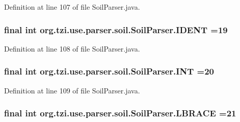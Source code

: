 Definition at line 107 of file Soil\-Parser.\-java.

\hypertarget{classorg_1_1tzi_1_1use_1_1parser_1_1soil_1_1_soil_parser_a79c40d3fad0b74d09c9e985a6bef0285}{
\subsubsection[{I\-D\-E\-N\-T}]{\setlength{\rightskip}{0pt plus 5cm}final int org.\-tzi.\-use.\-parser.\-soil.\-Soil\-Parser.\-I\-D\-E\-N\-T =19\hspace{0.3cm}{\ttfamily [static]}}}\label{classorg_1_1tzi_1_1use_1_1parser_1_1soil_1_1_soil_parser_a79c40d3fad0b74d09c9e985a6bef0285}


Definition at line 108 of file Soil\-Parser.\-java.

\hypertarget{classorg_1_1tzi_1_1use_1_1parser_1_1soil_1_1_soil_parser_a5220867ecf62025a93b2fddf9031a053}{
\subsubsection[{I\-N\-T}]{\setlength{\rightskip}{0pt plus 5cm}final int org.\-tzi.\-use.\-parser.\-soil.\-Soil\-Parser.\-I\-N\-T =20\hspace{0.3cm}{\ttfamily [static]}}}\label{classorg_1_1tzi_1_1use_1_1parser_1_1soil_1_1_soil_parser_a5220867ecf62025a93b2fddf9031a053}


Definition at line 109 of file Soil\-Parser.\-java.

\hypertarget{classorg_1_1tzi_1_1use_1_1parser_1_1soil_1_1_soil_parser_ad5f913d1bd234ab9c5fb39e2c03c1640}{
\subsubsection[{L\-B\-R\-A\-C\-E}]{\setlength{\rightskip}{0pt plus 5cm}final int org.\-tzi.\-use.\-parser.\-soil.\-Soil\-Parser.\-L\-B\-R\-A\-C\-E =21\hspace{0.3cm}{\ttfamily [static]}}}\label{classorg_1_1tzi_1_1use_1_1parser_1_1soil_1_1_soil_parser_ad5f913d1bd234ab9c5fb39e2c03c1640}


